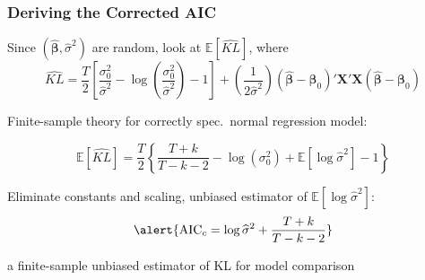 \begin{frame}
  \frametitle{Deriving the Corrected AIC} 
  Since $(\widehat{\boldsymbol{\beta}}, \widehat{\sigma}^2)$ are random, look at $\mathbb{E}[\widehat{KL}]$, where
  \small
      \[
        \widehat{KL} = \frac{T}{2}\left[ \frac{\sigma_0^2}{\widehat{\sigma}^2} - \log \left( \frac{\sigma_0^2}{\widehat{\sigma}^2} \right) - 1\right] + \left( \frac{1}{2 \widehat{\sigma}^2} \right)(\widehat{\boldsymbol{\beta}} -  \boldsymbol{\beta}_0)' \mathbf{X}'\mathbf{X} (\widehat{\boldsymbol{\beta}} - \boldsymbol{\beta}_0)
      \]

      \pause

      \normalsize
  Finite-sample theory for correctly spec.\ normal regression model:

  \[
    \mathbb{E}\left[ \widehat{KL} \right] = \frac{T}{2}\left\{ \frac{T + k}{T-k-2} - \log(\sigma_0^2) + \mathbb{E}[\log \widehat{\sigma}^2 ] - 1\right\}
  \]
   
  \pause

  \vspace{1em}
  Eliminate constants and scaling, unbiased estimator of $\mathbb{E}[\log \widehat{\sigma}^2]$:
  \vspace{-0.5em}
 \[
   \alert{\text{AIC}_c = \log \widehat{\sigma}^2 + \frac{T+k}{T-k-2}}
 \]

  \vspace{-0.5em}
  a finite-sample unbiased estimator of KL for model comparison

\end{frame}
%
%
%
%
